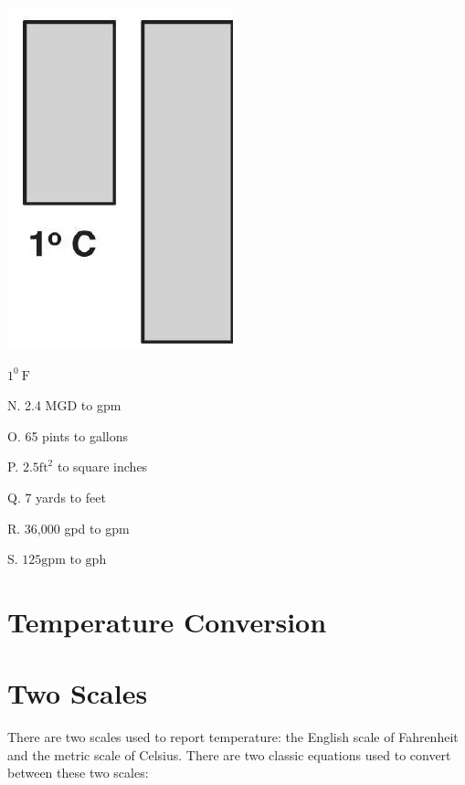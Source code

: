 \documentclass[10pt]{article}
\begin{document}
\includegraphics[max width=\textwidth]{2022_09_11_72dbedc910e6e984560cg-39(1)}

$1^{0} \mathrm{~F}$

N. 2.4 MGD to gpm

O. 65 pints to gallons

P. $2.5 \mathrm{ft}^{2}$ to square inches

Q. 7 yards to feet

R. 36,000 gpd to gpm

S. $125 \mathrm{gpm}$ to $\mathrm{gph}$

\section{Temperature Conversion}
\section{Two Scales}
There are two scales used to report temperature: the English scale of Fahrenheit and the metric scale of Celsius. There are two classic equations used to convert between these two scales:
\end{document}
